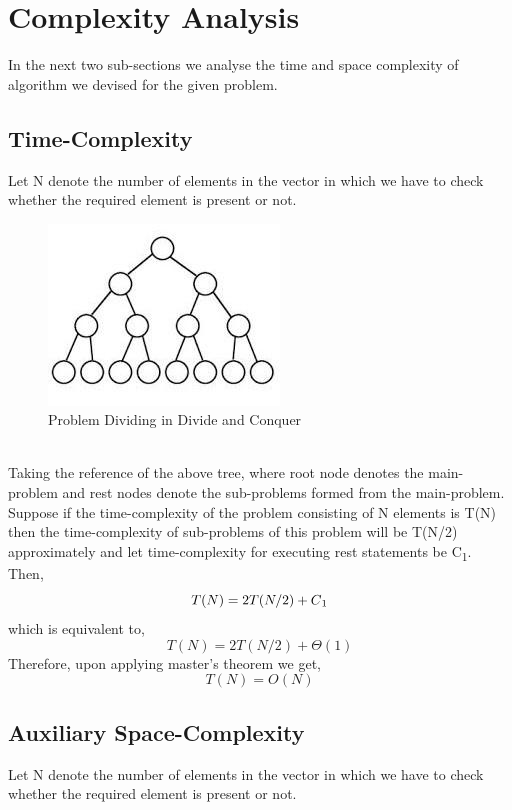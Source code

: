 \documentclass[conference]{IEEEtran}
\begin{document}
\section{Complexity Analysis}
In the next two sub-sections we analyse the time and space complexity of algorithm we devised for the given problem.
\subsection{Time-Complexity}
Let N denote the number of elements in the vector in which we have to check whether the required element is present or not.\\
\begin{figure}[htbp]
\centerline{\includegraphics{image20.jpg}}
\caption{Problem Dividing in Divide and Conquer}
\label{fig}
\end{figure}\\

Taking  the reference of the above tree, where root node denotes  the main-problem and rest nodes denote the sub-problems formed from the main-problem. Suppose if the time-complexity of the problem consisting of N elements is T(N) then the time-complexity of sub-problems of this problem will be T(N/2) approximately and let time-complexity for executing rest statements be C\textsubscript{1}.\\
Then,\\
\begin{equation}
    T(N) = 2T(N/2) + C\textsubscript{1}
\end{equation}
which is equivalent to,
\begin{equation}
    T(N) = 2T(N/2) + \Theta(1)
\end{equation}
Therefore, upon applying master’s theorem we get,
\begin{equation}
    T(N) = O(N)
\end{equation}
\subsection{Auxiliary Space-Complexity}
Let N denote the number of elements in the vector in which we have to check whether the required element is present or not.
\end{document}
